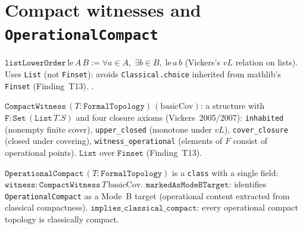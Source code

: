 \section{Compact witnesses and \texttt{OperationalCompact}}
\label{sec:topology_compact}

\begin{definition}
\label{def:listLowerOrder}
\leanok
{}
$\texttt{listLowerOrder}\,\text{le}\,A\,B := \forall a \in A,\; \exists b \in B,\; \text{le}\,a\,b$
(Vickers's $vL$ relation on lists).
Uses \texttt{List} (not \texttt{Finset}): avoids \texttt{Classical.choice}
inherited from mathlib's \texttt{Finset} (Finding~T13).
\axiomprofile{[]}.
\end{definition}

\begin{definition}
\label{def:CompactWitness}
\leanok
{}
$\texttt{CompactWitness}\,(T : \texttt{FormalTopology})\,(\text{basicCov})$:
a structure with $\texttt{F} : \texttt{Set}\,(\texttt{List}\,T.S)$ and
four closure axioms (Vickers~2005/2007):
\texttt{inhabited} (nonempty finite cover),
\texttt{upper\_closed} (monotone under $vL$),
\texttt{cover\_closure} (closed under covering),
\texttt{witness\_operational} (elements of $F$ consist of operational points).
$\texttt{List}$ over $\texttt{Finset}$ (Finding~T13).
\end{definition}

\begin{definition}
\label{def:OperationalCompact}
\leanok
{}
$\texttt{OperationalCompact}\,(T : \texttt{FormalTopology})$ is a
\texttt{class} with a single field:
$\texttt{witness} : \texttt{CompactWitness}\,T\,\text{basicCov}$.
$\texttt{markedAsModeBTarget}$: identifies \texttt{OperationalCompact}
as a Mode~B target (operational content extracted from classical compactness).
$\texttt{implies\_classical\_compact}$: every operational compact topology
is classically compact.
\end{definition}

